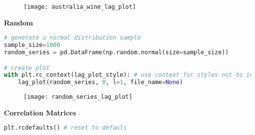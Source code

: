 \begin{figure}[h!]
  \centering
  \texttt{[image: australia\_wine\_lag\_plot]}
\end{figure}\newpage


{\noindent\hspace{-12.5pt}\normalsize\bfseries Random}\vspace{-10pt}
\begin{center}
  \begin{lstlisting}[language=Python, 
  caption={График задержек белого шума.}, 
  label={lst:time_series_lag_plot_random}]
# generate a normal distribution sample
sample_size=1000
random_series = pd.DataFrame(np.random.normal(size=sample_size)) 

# create plot
with plt.rc_context(lag_plot_style): # use context for styles not to interfere
    lag_plot(random_series, 0, l=1, file_name=None)
  \end{lstlisting}
\end{center}

\begin{figure}[h!]
  \centering
  \texttt{[image: random\_series\_lag\_plot]}
\end{figure}\newpage


\begin{center}
  \noindent\normalsize\bfseries
  Correlation Matrices
\end{center}\vspace{-17.5pt}

\begin{center}
  \begin{lstlisting}[language=Python]
plt.rcdefaults() # reset to defauls
  \end{lstlisting}
\end{center}

